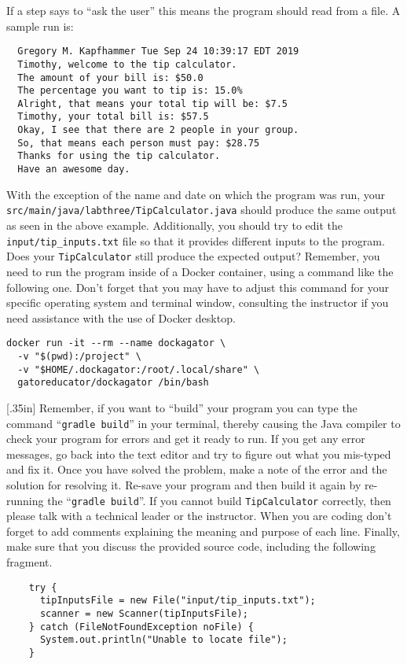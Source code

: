 \documentclass[11pt]{article}
\newcommand{\mainprogram}{\lstinline{TipCalculator}}
\newcommand{\mainprogramsource}{\lstinline{src/main/java/labthree/TipCalculator.java}}
\newcommand{\mainprograminput}{\lstinline{input/tip_inputs.txt}}
\newcommand{\gradlebuild}{\command{gradle build}}
\newcommand{\command}[1]{``\lstinline{#1}''}
\newcommand{\step}[1]{``{#1}''}
\newcommand{\discuss}[1]{\null\hfill\LARGE{\faCommentO{}}\newline\scriptsize{\em{#1}}}
\begin{document}
\noindent If a step says to ``ask the user'' this means the program should read
from a file. A sample run is:

\begin{verbatim}
  Gregory M. Kapfhammer Tue Sep 24 10:39:17 EDT 2019
  Timothy, welcome to the tip calculator.
  The amount of your bill is: $50.0
  The percentage you want to tip is: 15.0%
  Alright, that means your total tip will be: $7.5
  Timothy, your total bill is: $57.5
  Okay, I see that there are 2 people in your group.
  So, that means each person must pay: $28.75
  Thanks for using the tip calculator.
  Have an awesome day.
\end{verbatim}

With the exception of the name and date on which the program was run, your
\mainprogramsource{} should produce the same output as seen in the above
example. Additionally, you should try to edit the \mainprograminput{} file so
that it provides different inputs to the program. Does your \mainprogram{} still
produce the expected output? Remember, you need to run the program inside of a
Docker container, using a command like the following one. Don't forget that you
may have to adjust this command for your specific operating system and terminal
window, consulting the instructor if you need assistance with the use of Docker
desktop.

\begin{verbatim}
docker run -it --rm --name dockagator \
  -v "$(pwd):/project" \
  -v "$HOME/.dockagator:/root/.local/share" \
  gatoreducator/dockagator /bin/bash
\end{verbatim}

\marginnote{\discuss{Discuss input code}}[.35in] Remember, if you want to
\step{build} your program you can type the command \gradlebuild{} in your
terminal, thereby causing the Java compiler to check your program for errors and
get it ready to run. If you get any error messages, go back into the text editor
and try to figure out what you mis-typed and fix it. Once you have solved the
problem, make a note of the error and the solution for resolving it. Re-save
your program and then build it again by re-running the \gradlebuild{}. If you
cannot build \mainprogram{} correctly, then please talk with a technical leader
or the instructor. When you are coding don't forget to add comments explaining
the meaning and purpose of each line. Finally, make sure that you discuss the
provided source code, including the following fragment.

\begin{verbatim}
    try {
      tipInputsFile = new File("input/tip_inputs.txt");
      scanner = new Scanner(tipInputsFile);
    } catch (FileNotFoundException noFile) {
      System.out.println("Unable to locate file");
    }
\end{verbatim}
\end{document}
